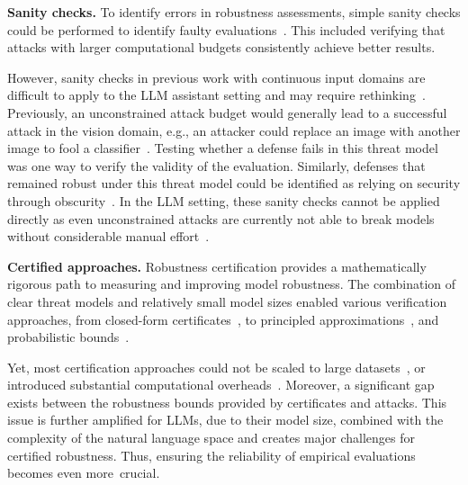 \textbf{Sanity checks.} To identify errors in robustness assessments, simple sanity checks could be performed to identify faulty evaluations~\cite{uesato2018adversarial, carlini_evaluating_2019}. This included verifying that attacks with larger computational budgets consistently achieve better results. %

However, sanity checks in previous work with continuous input domains are difficult to apply to the LLM assistant setting and may require rethinking~\citep{athalye_obfuscated_2018, carlini_evaluating_2019, tramer_adaptive_2020}. Previously, an unconstrained attack budget would generally lead to a successful attack in the vision domain, e.g., an attacker could replace an image with another image to fool a classifier~\cite{carlini_evaluating_2019}. Testing whether a defense fails in this threat model was one way to verify the validity of the evaluation. Similarly, defenses that remained robust under this threat model could be identified as relying on security through obscurity~\citep{athalye_obfuscated_2018}. In the LLM setting, these sanity checks cannot be applied directly as even unconstrained attacks are currently not able to break models without considerable manual effort~\cite{li2024llm}.

\textbf{Certified approaches.} Robustness certification provides a mathematically rigorous path to measuring and improving model robustness. The combination of clear threat models and relatively small model sizes enabled various verification approaches, from closed-form certificates~\cite{tjeng2017evaluating}, to principled approximations~\cite{gowal2018effectiveness}, and probabilistic bounds~\cite{cohen2019certified}. 

Yet, most certification approaches could not be scaled to large datasets~\cite{tjeng2017evaluating}, or introduced substantial computational overheads~\cite{cohen2019certified}. Moreover, a significant gap exists between the robustness bounds provided by certificates and attacks.
This issue is further amplified for LLMs, due to their model size, combined with the complexity of the natural language space and creates major challenges for certified robustness. Thus, ensuring the reliability of empirical evaluations becomes even more~crucial. 
\vspace{-10pt}
